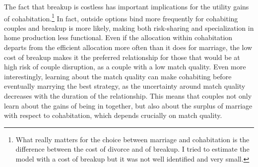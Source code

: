 \documentclass[12pt]{article}
\begin{document}
The fact that breakup is costless has important implications for the utility gains of cohabitation.\footnote{What really matters for the choice between marriage and cohabitation is the difference between the cost of divorce and of breakup. I tried to estimate the model with a cost of breakup but it was not well identified and very small.} In fact, outside options bind more frequently for cohabiting couples and breakup is more likely, making both risk-sharing and specialization in home production less functional. Even if the allocation within cohabitation departs from the efficient allocation more often than it does for marriage, the low cost of breakup makes it the preferred relationship for those that would be at high risk of couple disruption, as a couple with a low match quality. Even more interestingly, learning about the match quality can make cohabiting before eventually marrying the best strategy, as the uncertainty around match quality decreases with the duration of the relationship. This means that couples not only learn about the gains of being in together, but also about the surplus of marriage with respect to cohabitation, which depends crucially on match quality.
\end{document}
